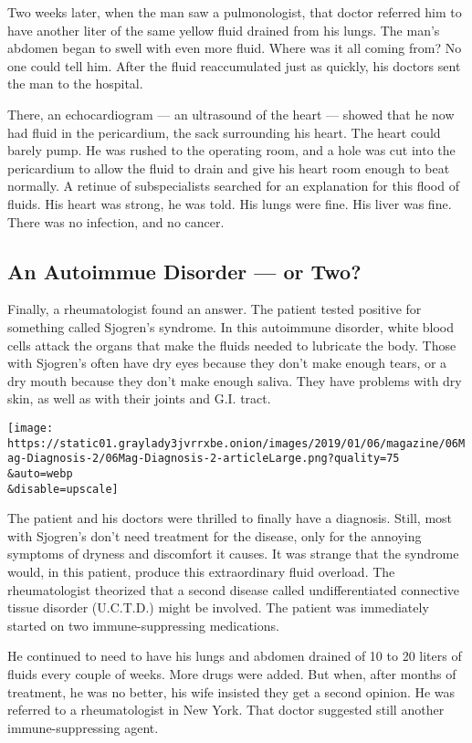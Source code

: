 Two weeks later, when the man saw a pulmonologist, that doctor referred
him to have another liter of the same yellow fluid drained from his
lungs. The man's abdomen began to swell with even more fluid. Where was
it all coming from? No one could tell him. After the fluid reaccumulated
just as quickly, his doctors sent the man to the hospital.

There, an echocardiogram --- an ultrasound of the heart --- showed that
he now had fluid in the pericardium, the sack surrounding his heart. The
heart could barely pump. He was rushed to the operating room, and a hole
was cut into the pericardium to allow the fluid to drain and give his
heart room enough to beat normally. A retinue of subspecialists searched
for an explanation for this flood of fluids. His heart was strong, he
was told. His lungs were fine. His liver was fine. There was no
infection, and no cancer.

\hypertarget{an-autoimmue-disorder--or-two}{%
\subsection{\texorpdfstring{\textbf{An Autoimmue Disorder --- or
Two?}}{An Autoimmue Disorder --- or Two?}}\label{an-autoimmue-disorder--or-two}}

Finally, a rheumatologist found an answer. The patient tested positive
for something called Sjogren's syndrome. In this autoimmune disorder,
white blood cells attack the organs that make the fluids needed to
lubricate the body. Those with Sjogren's often have dry eyes because
they don't make enough tears, or a dry mouth because they don't make
enough saliva. They have problems with dry skin, as well as with their
joints and G.I. tract.

\texttt{[image: https://static01.graylady3jvrrxbe.onion/images/2019/01/06/magazine/06Mag-Diagnosis-2/06Mag-Diagnosis-2-articleLarge.png?quality=75\\\&auto=webp\\\&disable=upscale]}

The patient and his doctors were thrilled to finally have a diagnosis.
Still, most with Sjogren's don't need treatment for the disease, only
for the annoying symptoms of dryness and discomfort it causes. It was
strange that the syndrome would, in this patient, produce this
extraordinary fluid overload. The rheumatologist theorized that a second
disease called undifferentiated connective tissue disorder (U.C.T.D.)
might be involved. The patient was immediately started on two
immune-suppressing medications.

He continued to need to have his lungs and abdomen drained of 10 to 20
liters of fluids every couple of weeks. More drugs were added. But when,
after months of treatment, he was no better, his wife insisted they get
a second opinion. He was referred to a rheumatologist in New York. That
doctor suggested still another immune-suppressing agent.

